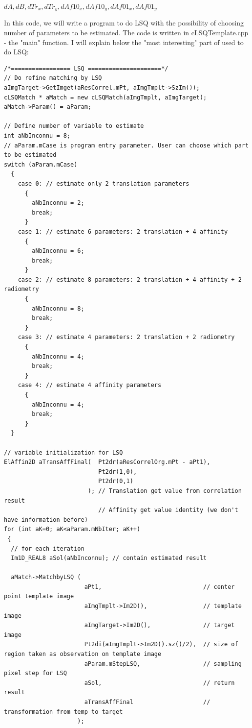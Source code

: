 \documentclass[twoside]{article}
\begin{document}
$dA, dB, dTr_x, dTr_y, dAf10_x, dAf10_y, dAf01_x, dAf01_y$

In this code, we will write a program to do LSQ with the possibility of choosing number of parameters to be estimated. The code is written in {\color{blue}cLSQTemplate.cpp} - the "main" function. I will explain below the "most interesting" part of used to do LSQ:

\begin{lstlisting}
/*================= LSQ =====================*/
// Do refine matching by LSQ
aImgTarget->GetImget(aResCorrel.mPt, aImgTmplt->SzIm());
cLSQMatch * aMatch = new cLSQMatch(aImgTmplt, aImgTarget);
aMatch->Param() = aParam;

// Define number of variable to estimate
int aNbInconnu = 8;
// aParam.mCase is program entry parameter. User can choose which part to be estimated
switch (aParam.mCase)  
  {
    case 0: // estimate only 2 translation parameters
      {
        aNbInconnu = 2;	
        break;
      }
    case 1: // estimate 6 parameters: 2 translation + 4 affinity
      {
        aNbInconnu = 6;
        break;
      }
    case 2: // estimate 8 parameters: 2 translation + 4 affinity + 2 radiometry
      {
        aNbInconnu = 8;
        break;
      }
    case 3: // estimate 4 parameters: 2 translation + 2 radiometry 
      {
        aNbInconnu = 4;
        break;
      }
    case 4: // estimate 4 affinity parameters 
      {
        aNbInconnu = 4;
        break;
      }
  }

// variable initialization for LSQ
ElAffin2D aTransAffFinal(  Pt2dr(aResCorrelOrg.mPt - aPt1),
                           Pt2dr(1,0),
                           Pt2dr(0,1)
                        ); // Translation get value from correlation result
                           // Affinity get value identity (we don't have information before)
for (int aK=0; aK<aParam.mNbIter; aK++)
 {
  // for each iteration
  Im1D_REAL8 aSol(aNbInconnu); // contain estimated result	

  aMatch->MatchbyLSQ (
                       aPt1,                             // center point template image 
                       aImgTmplt->Im2D(),                // template image				
                       aImgTarget->Im2D(),               // target image
                       Pt2di(aImgTmplt->Im2D().sz()/2),  // size of region taken as observation on template image
                       aParam.mStepLSQ,                  // sampling pixel step for LSQ
                       aSol,                             // return result
                       aTransAffFinal                    // transformation from temp to target
                     );



\end{lstlisting}
\end{document}

